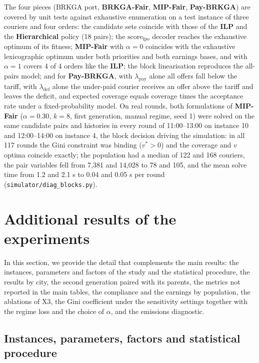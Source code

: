 \documentclass[a4paper,11pt,review,3p,authoryear]{elsarticle}
\begin{document}
The four pieces (BRKGA port, \textbf{BRKGA-Fair}, \textbf{MIP-Fair}, \textbf{Pay-BRKGA}) are covered by unit tests against exhaustive enumeration on a test instance of three couriers and four orders: the candidate sets coincide with those of the \textbf{ILP} and the \textbf{Hierarchical} policy (18 pairs); the $\text{score}_{\text{fpo}}$ decoder reaches the exhaustive optimum of its fitness; \textbf{MIP-Fair} with $\alpha = 0$ coincides with the exhaustive lexicographic optimum under both priorities and both earnings bases, and with $\alpha = 1$ covers 4 of 4 orders like the \textbf{ILP}; the block linearisation reproduces the all-pairs model; and for \textbf{Pay-BRKGA}, with $\lambda_{\text{pay}}$ alone all offers fall below the tariff, with $\lambda_{\text{def}}$ alone the under-paid courier receives an offer above the tariff and leaves the deficit, and expected coverage equals coverage times the acceptance rate under a fixed-probability model. On real rounds, both formulations of \textbf{MIP-Fair} ($\alpha = 0.30$, $k = 8$, first generation, manual regime, seed 1) were solved on the same candidate pairs and histories in every round of 11:00--13:00 on instance 10 and 12:00--14:00 on instance 4, the block decision driving the simulation: in all 117 rounds the Gini constraint was binding ($v^* > 0$) and the coverage and $v$ optima coincide exactly; the population had a median of 122 and 168 couriers, the pair variables fell from 7{,}381 and 14{,}028 to 78 and 105, and the mean solve time from 1.2 and 2.1 s to 0.04 and 0.05 s per round (\texttt{simulator/diag\_blocks.py}).

\section{Additional results of the experiments}
\label{sec:App_add_results}

In this section, we provide the detail that complements the main results: the instances, parameters and factors of the study and the statistical procedure, the results by city, the second generation paired with its parents, the metrics not reported in the main tables, the compliance and the earnings by population, the ablations of X3, the Gini coefficient under the sensitivity settings together with the regime loss and the choice of $\alpha$, and the emissions diagnostic.

\subsection{Instances, parameters, factors and statistical procedure}
\label{sec:App_instances}
\end{document}
